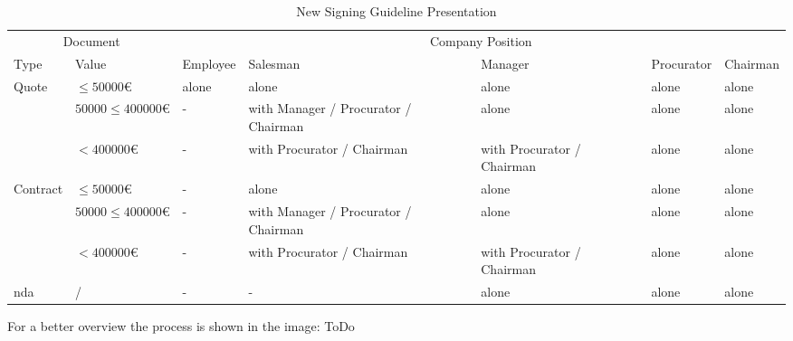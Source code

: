 \begin{table}[h!]
	\begin{tabular}{|p{1.5cm}|p{2cm}|p{2cm}|p{2cm}|p{2cm}|p{2cm}|p{2cm}|} \hline
		\multicolumn{2}{|c|}{Document} & \multicolumn{5}{c|}{Company Position}\\ 
		Type & Value & Employee & Salesman & Manager & Procurator & Chairman \\ \hline
		\multirow{3}{1.5cm}{Quote} & $ \leq 50 000 \euro$ & alone & alone & alone & alone & alone \\ \cline{2-7}
							 & $ 50 000 \leq 400 000 \euro$ & - & with Manager / Procurator / Chairman & alone & alone & alone \\ \cline{2-7}
							 & $ < 400 000 \euro$ & - & with Procurator / Chairman & with Procurator / Chairman & alone & alone \\ \hline
		\multirow{3}{1.5cm}{Contract} & $ \leq 50 000 \euro$ & - & alone & alone & alone & alone \\ \cline{2-7}
									& $ 50 000 \leq 400 000 \euro$ & - & with Manager / Procurator / Chairman & alone & alone & alone \\ \cline{2-7}
									& $ < 400 000 \euro$ & - & with Procurator / Chairman
									& with Procurator / Chairman & alone & alone \\ \hline
		\Gls{nda} & / & - & - & alone & alone & alone \\ \hline
	\end{tabular}
	\centering
	\caption{New Signing Guideline Presentation}
	\label{tab:newSigningGuideline}
\end{table}

For a better overview the process is shown in the image: ToDo 
